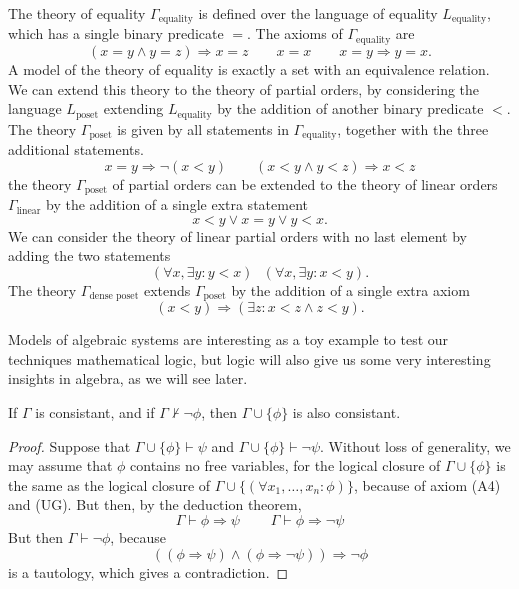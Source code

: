 \begin{example}
    The theory of equality $\Gamma_{\text{equality}}$ is defined over the language of equality $L_{\text{equality}}$, which has a single binary predicate $=$. The axioms of $\Gamma_{\text{equality}}$ are
    \[ (x = y \wedge y = z) \Rightarrow x = z \quad\quad x = x \quad\quad x = y \Rightarrow y = x. \]
    A model of the theory of equality is exactly a set with an equivalence relation. We can extend this theory to the theory of partial orders, by considering the language $L_{\text{poset}}$ extending $L_{\text{equality}}$ by the addition of another binary predicate $<$. The theory $\Gamma_{\text{poset}}$ is given by all statements in $\Gamma_{\text{equality}}$, together with the three additional statements.
    \[ x = y \Rightarrow \neg (x < y) \quad\quad (x < y \wedge y < z) \Rightarrow x < z \]
    the theory $\Gamma_{\text{poset}}$ of partial orders can be extended to the theory of linear orders $\Gamma_{\text{linear}}$ by the addition of a single extra statement
    \[ x < y \vee x = y \vee y < x. \]
    We can consider the theory of linear partial orders with no last element by adding the two statements
    \[ (\forall x, \exists y: y < x)\ \ \ (\forall x, \exists y: x < y). \]
    The theory $\Gamma_{\text{dense poset}}$ extends $\Gamma_{\text{poset}}$ by the addition of a single extra axiom
    \[ (x < y) \Rightarrow (\exists z: x < z \wedge z < y). \]
\end{example}

Models of algebraic systems are interesting as a toy example to test our techniques mathematical logic, but logic will also give us some very interesting insights in algebra, as we will see later.

\begin{theorem}
    If $\Gamma$ is consistant, and if $\Gamma \not \vdash \neg \phi$, then $\Gamma \cup \{ \phi \}$ is also consistant.
\end{theorem}
\begin{proof}
    Suppose that $\Gamma \cup \{ \phi \} \vdash \psi$ and $\Gamma \cup \{ \phi \} \vdash \neg \psi$. Without loss of generality, we may assume that $\phi$ contains no free variables, for the logical closure of $\Gamma \cup \{ \phi \}$ is the same as the logical closure of $\Gamma \cup \{ (\forall x_1, \dots, x_n: \phi) \}$, because of axiom (A4) and (UG). But then, by the deduction theorem,
    \[ \Gamma \vdash \phi \Rightarrow \psi\ \ \ \ \ \ \ \ \ \ \Gamma \vdash \phi \Rightarrow \neg \psi \]
    But then $\Gamma \vdash \neg \phi$, because
    \[ ((\phi \Rightarrow \psi) \wedge (\phi \Rightarrow \neg \psi)) \Rightarrow \neg \phi \]
    is a tautology, which gives a contradiction.
\end{proof}

